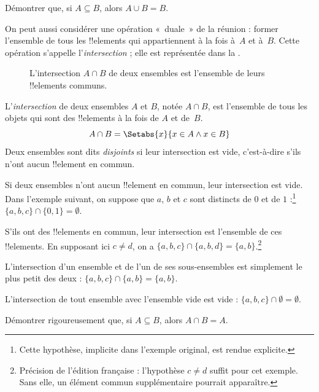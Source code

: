 \documentclass[11pt,a4paper,openany]{memoir}
\begin{document}
\begin{prob}
Démontrer que, si $A \subseteq B$, alors $A \cup B = B$.
\end{prob}

\begin{explain}
On peut aussi considérer une opération «~duale~» de la réunion :
former l'ensemble de tous les !!{element}s qui appartiennent
à la fois à~$A$ et à~$B$. Cette opération s'appelle
l'\emph{intersection} ; elle est représentée dans
la .
\begin{figure}
  \caption{L'intersection $A \cap B$ de deux ensembles est
    l'ensemble de leurs !!{element}s communs.}
\end{figure}
\end{explain}

\begin{defn}[Intersection]
L'\emph{intersection} de deux ensembles $A$ et $B$, notée
$A \cap B$, est l'ensemble de tous les objets qui sont
des !!{element}s à la fois de $A$ et de~$B$.
\[
A \cap B = \Setabs{x}{x \in A \land x \in B}
\]
Deux ensembles sont dits \emph{disjoints} si leur intersection
est vide, c'est-à-dire s'ils n'ont aucun !!{element} en commun.
\end{defn}

\begin{ex}
Si deux ensembles n'ont aucun !!{element} en commun, leur
intersection est vide. Dans l'exemple suivant, on suppose que
$a$, $b$ et $c$ sont distincts de $0$ et de $1$ :\footnote{Cette
hypothèse, implicite dans l'exemple original, est rendue explicite.}
$\{ a, b, c\} \cap \{ 0, 1\} = \emptyset$.

S'ils ont des !!{element}s en commun, leur intersection est
l'ensemble de ces !!{element}s. En supposant ici $c\neq d$,
on a $\{a, b, c \} \cap \{a, b, d \} = \{a, b\}$.\footnote{Précision
de l'édition française : l'hypothèse $c\neq d$ suffit pour cet exemple.
Sans elle, un élément commun supplémentaire pourrait apparaître.}

L'intersection d'un ensemble et de l'un de ses sous-ensembles
est simplement le plus petit des deux :
$\{a, b, c\} \cap \{a, b\} = \{a, b\}$.

L'intersection de tout ensemble avec l'ensemble vide est vide :
$\{a, b, c \} \cap \emptyset = \emptyset$.
\end{ex}

\begin{prob}
Démontrer rigoureusement que, si $A \subseteq B$, alors
$A \cap B = A$.
\end{prob}
\end{document}
